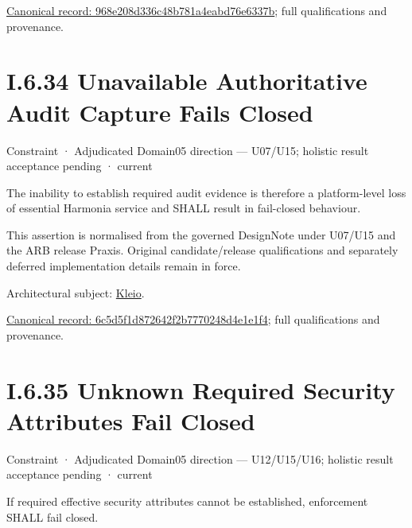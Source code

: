 {\footnotesize \href{../../../../../../../../continuum/motivation/constraint/968e208d336c48b781a4eabd76e6337b.md}{Canonical record: 968e208d336c48b781a4eabd76e6337b}; full qualifications and provenance.}\par
\section*{I.6.34 Unavailable Authoritative Audit Capture Fails Closed}
\label{navigation:I.6.34}

\label{element:6c5d5f1d872642f2b7770248d4e1e1f4}
{\small Constraint · Adjudicated Domain05 direction — U07/U15; holistic result acceptance pending · current}\par

The inability to establish required audit evidence is therefore a platform-level loss of essential Harmonia service and SHALL result in fail-closed behaviour.



This assertion is normalised from the governed DesignNote under U07/U15 and the ARB release Praxis. Original candidate/release qualifications and separately deferred implementation details remain in force.



Architectural subject: \hyperref[element:fefda110e2274884ad58906733606efd]{Kleio}.


{\footnotesize \href{../../../../../../../../continuum/motivation/constraint/6c5d5f1d872642f2b7770248d4e1e1f4.md}{Canonical record: 6c5d5f1d872642f2b7770248d4e1e1f4}; full qualifications and provenance.}\par
\section*{I.6.35 Unknown Required Security Attributes Fail Closed}
\label{navigation:I.6.35}

\label{element:7ea0d91ed25848f4add672ddf08f42a2}
{\small Constraint · Adjudicated Domain05 direction — U12/U15/U16; holistic result acceptance pending · current}\par

If required effective security attributes cannot be established, enforcement SHALL fail closed.



